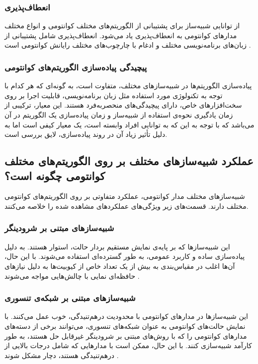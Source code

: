 \subsubsection{انعطاف‌پذیری}
از توانایی شبیه‌ساز برای پشتیبانی از الگوریتم‌های مختلف کوانتومی و انواع مختلف مدارهای کوانتومی به انعطاف‌پذیری یاد می‌شود. انعطاف‌پذیری شامل پشتیبانی از زبان‌های برنامه‌نویسی مختلف و ادغام با چارچوب‌های مختلف رایانش کوانتومی است \cite{jamadagni_benchmarking_2024, lubinski_application-oriented_2023, young_simulating_2023}.
\subsubsection{پیچیدگی پیاده‌سازی الگوریتم‌های کوانتومی}
پیاده‌سازی الگوریتم‌ها در شبیه‌سازهای مختلف، متفاوت است، به گونه‌ای که هر کدام با توجه به تکنولوژی مورد استفاده مثل زبان برنامه‌نویسی، قابلیت اجرا بر روی سخت‌افزارهای خاص، دارای پیچیدگی‌های منحصربه‌فرد هستند. این معیار، ترکیبی از زمان یادگیری نحوه‌ی استفاده از شبیه‌ساز و زمان پیاده‌سازی یک الگوریتم در آن می‌باشد که با توجه به این که به توانایی افراد وابسته است، یک معیار کیفی است اما به دلیل تأثیر زیاد آن در روند پیاده‌سازی، لایق بررسی است.

\subsection*{عملکرد شبیه‌سازهای مختلف بر روی الگوریتم‌های مختلف کوانتومی چگونه است؟}
شبیه‌سازهای مختلف مدار کوانتومی، عملکرد متفاوتی بر روی الگوریتم‌های کوانتومی مختلف دارند. قسمت‌های زیر ویژگی‌های عملکرد‌های مشاهده شده را خلاصه می‌کنند.
\subsubsection{شبیه‌سازهای مبتنی بر شرودینگر}
این شبیه‌سازها که بر پایه‌ی نمایش مستقیم بردار حالت، استوار هستند. به دلیل پیاده‌سازی ساده و کاربرد عمومی، به طور گسترده‌ای استفاده می‌شوند. با این حال، آن‌ها اغلب در مقیاس‌بندی به بیش از یک تعداد خاص از کیوبیت‌ها به دلیل نیازهای حافظه‌ای نمایی با چالش‌هایی مواجه می‌شوند \cite{young_simulating_2023}.
\subsubsection{شبیه‌سازهای مبتنی بر شبکه‌ی تنسوری}
این شبیه‌سازها در مدارهای کوانتومی با محدودیت درهم‌تنیدگی، خوب عمل می‌کنند. با نمایش حالت‌های کوانتومی به عنوان شبکه‌های تنسوری، می‌توانند برخی از دسته‌های مدارهای کوانتومی را که با روش‌های مبتنی بر شرودینگر غیرقابل حل هستند، به طور کارآمد شبیه‌سازی کنند. با این حال، ممکن است با مدارهایی که شامل درجات بالایی از درهم‌تنیدگی هستند، دچار مشکل شوند \cite{young_simulating_2023}.
